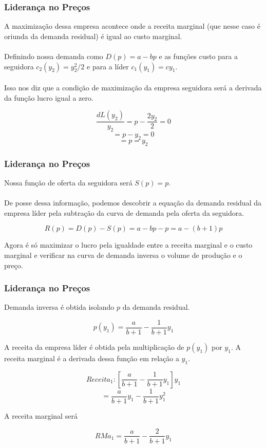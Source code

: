 \documentclass{beamer}[10]
\begin{document}
\begin{frame}
	\frametitle{Liderança no Preços}

	A maximização dessa empresa acontece onde a receita marginal (que nesse caso é oriunda da demanda residual) é igual ao custo marginal.
	\\~\\
	Definindo nossa demanda como $D(p) = a - bp$ e as funções custo para a seguidora $c_2(y_2) = y_2^2/2$ e para a líder $c_1(y_1) = cy_1$.
	\\~\\
	Isso nos diz que a condição de maximização da empresa seguidora será a derivada da função lucro igual a zero.

	$$ \frac{d L(y_2)}{y_2} = p - \frac{2y_2}{2} = 0 $$
	$$ = p - y_2 = 0 $$
	$$ = p = y_2 $$

\end{frame}

\begin{frame}
	\frametitle{Liderança no Preços}

	Nossa função de oferta da seguidora será $S(p) = p$. 
	\\~\\
	De posse dessa informação, podemos descobrir a equação da demanda residual da empresa líder pela subtração da curva de demanda pela oferta da seguidora.

	$$ R(p) = D(p) - S(p) = a - bp - p = a - (b + 1)p $$

	Agora é só maximizar o lucro pela igualdade entre a receita marginal e o custo marginal e verificar na curva de demanda inversa o volume de produção e o preço.

\end{frame}

\begin{frame}
	\frametitle{Liderança no Preços}

	Demanda inversa é obtida isolando $p$ da demanda residual.

	$$ p(y_1) = \frac{a}{b+1}-\frac{1}{b+1}y_1 $$

	A receita da empresa líder é obtida pela multiplicação de $p(y_1)$ por $y_1$. A receita marginal é a derivada dessa função em relação a $y_1$.

	$$ Receita_1: \left[ \frac{a}{b+1} - \frac{1}{b+1}y_1 \right] y_1 $$
	$$ = \frac{a}{b+1}y_1 - \frac{1}{b+1}y_1^2 $$

	A receita marginal será

	$$ RMa_1 = \frac{a}{b+1} - \frac{2}{b+1}y_1 $$

\end{frame}
\end{document}

